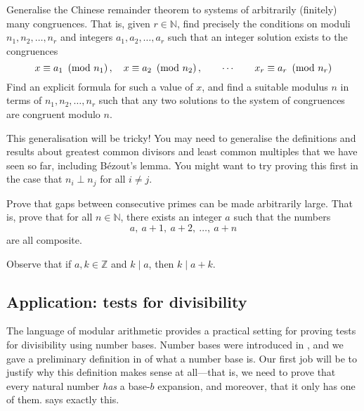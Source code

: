 \begin{oexercise}
\label{exGeneralisedCRT}
Generalise the Chinese remainder theorem to systems of arbitrarily (finitely) many congruences. That is, given $r \in \mathbb{N}$, find precisely the conditions on moduli $n_1,n_2,\dots,n_r$ and integers $a_1,a_2,\dots,a_r$ such that an integer solution exists to the congruences
\[ x \equiv a_1 ~\left(\text{mod}~n_1\right), \quad x \equiv a_2 ~\left(\text{mod}~n_2\right), \qquad \cdots \qquad x_r \equiv a_r ~\left(\text{mod}~n_r\right) \]
Find an explicit formula for such a value of $x$, and find a suitable modulus $n$ in terms of $n_1,n_2,\dots,n_r$ such that any two solutions to the system of congruences are congruent modulo $n$.
\begin{backhint}
This generalisation will be tricky! You may need to generalise the definitions and results about greatest common divisors and least common multiples that we have seen so far, including B\'{e}zout's lemma. You might want to try proving this first in the case that $n_i \perp n_j$ for all $i \ne j$.
\end{backhint}
\end{oexercise}

\begin{exercise}
\label{exGapsBetweenPrimesLarge}
Prove that gaps between consecutive primes can be made arbitrarily large. That is, prove that for all $n \in \mathbb{N}$, there exists an integer $a$ such that the numbers
\[ a,\ a+1,\ a+2,\ \dots,\ a+n \]
are all composite.
\begin{backhint}
Observe that if $a,k \in \mathbb{Z}$ and $k \mid a$, then $k \mid a+k$.
\end{backhint}
\end{exercise}

\subsection*{Application: tests for divisibility}

The language of modular arithmetic provides a practical setting for proving tests for divisibility using number bases. Number bases were introduced in , and we gave a preliminary definition in  of what a number base is. Our first job will be to justify why this definition makes sense at all---that is, we need to prove that every natural number \textit{has} a base-$b$ expansion, and moreover, that it only has one of them.  says exactly this.

